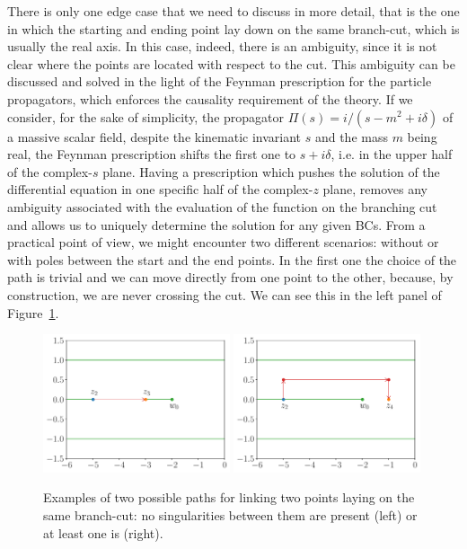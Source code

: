 \documentclass[final,1p,times]{elsarticle}
\begin{document}
There is only one edge case that we need to discuss in more detail, that is the one in which the starting and ending point lay down on the same branch-cut, which is usually the real axis. In this case, indeed, there is an ambiguity, since it is not clear where the points are located with respect to the cut. This ambiguity can be discussed and solved in the light of the Feynman prescription for the particle propagators, which enforces the causality requirement of the theory.
If we consider, for the sake of simplicity, the propagator $\Pi(s)=i/(s-m^2+i\delta)$ of a massive scalar field, despite the kinematic invariant $s$ and the mass $m$ being real, the Feynman prescription shifts the first one to $s+i\delta$, i.e. in the upper half of the complex-$s$ plane.
Having a prescription which pushes the solution of the differential equation in one specific half of the complex-$z$ plane, removes any ambiguity associated with the evaluation of the function on the branching cut and allows us to uniquely determine the solution for any given BCs.
From a practical point of view, we might encounter two different scenarios: without or with poles between the start and the end points. In the first one the choice of the path is trivial and we can move directly from one point to the other, because, by construction, we are never crossing the cut. We can see this in the left panel of Figure~\ref{fig:realAxis}. 
\begin{figure}[t]
\includegraphics[width=0.49\textwidth]{path_realaxis.pdf}
\includegraphics[width=0.49\textwidth]{path_realaxis2.pdf}
\caption{\label{fig:realAxis}
Examples of two possible paths for linking two points laying on the same branch-cut: no singularities between them are present (left) or at least one is (right).}
\end{figure}
\end{document}

